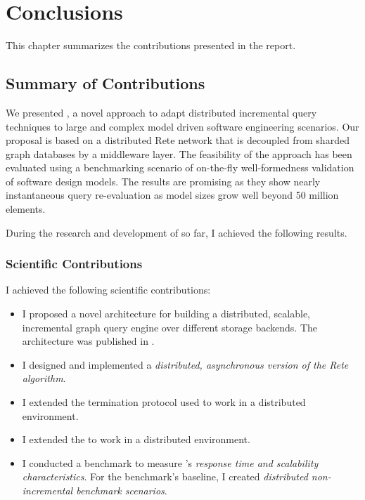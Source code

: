 \chapter{Conclusions}
\label{chap:conclusions}

This chapter summarizes the contributions presented in the report. 

\section{Summary of Contributions}

We presented \iqd{}, a novel approach to adapt distributed incremental query techniques to large and complex model driven software engineering scenarios. Our proposal is based on a distributed Rete network that is decoupled from sharded graph databases by a middleware layer. The feasibility of the approach has been evaluated using a benchmarking scenario of on-the-fly well-formedness validation of software design models. The results are promising as they show nearly instantaneous query re-evaluation as model sizes grow well beyond 50 million elements.

During the research and development of \iqd{} so far, I achieved the following results.

\subsection{Scientific Contributions}

I achieved the following scientific contributions:

\begin{itemize}
  \item I proposed a novel architecture for building a distributed, scalable, incremental graph query engine over different storage backends. The architecture was published in \cite{Izso:2013:IIG:2487766.2487772}. 
  \item I designed and implemented a \emph{distributed, asynchronous version of the Rete algorithm}. 
  \item I extended the termination protocol used \eiq{} to work in a distributed environment. 
  \item I extended the \tb{} to work in a distributed environment.  
  \item I conducted a benchmark to measure \iqd{}'s \emph{response time and scalability characteristics}. For the benchmark's baseline, I created \emph{distributed non-incremental benchmark scenarios}. 
\end{itemize}

